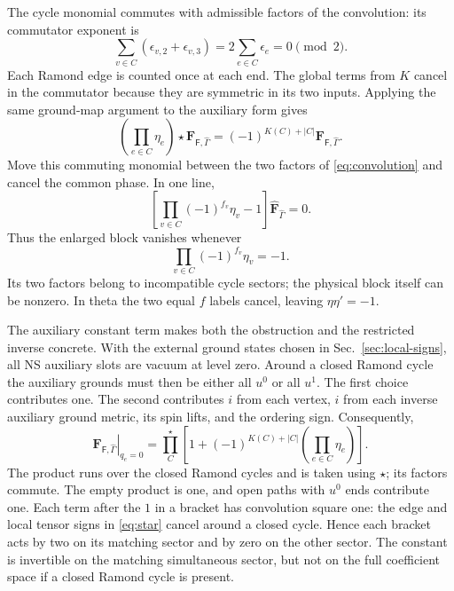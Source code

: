 \documentclass[11pt]{article}
\newcommand{\F}{\mathsf F}
\numberwithin{equation}{section}
\begin{document}
The cycle monomial commutes with admissible factors of the convolution:
its commutator exponent is
\begin{equation}
 \sum_{v\in C}(\epsilon_{v,2}+\epsilon_{v,3})
                  =2\sum_{e\in C}\epsilon_e=0\pmod2.
 \label{eq:loop-centrality}
\end{equation}
Each Ramond edge is counted once at each end. The global terms from
$K$ cancel in the commutator because they are symmetric in its two inputs.
Applying the same ground-map argument to the auxiliary
form gives
\begin{equation}
 \left(\prod_{e\in C}\eta_e\right)\star\mathbf F_{\F,\hat\Gamma}
 =(-1)^{K(C)+|C|}\mathbf F_{\F,\hat\Gamma}.
 \label{eq:aux-sector}
\end{equation}
Move this commuting monomial between the two factors of
\eqref{eq:convolution} and cancel the common phase. In one line,
\begin{equation}
 \left[\prod_{v\in C}(-1)^{f_v}\eta_v-1\right]
                               \widehat{\mathbf F}_{\hat\Gamma}=0.
 \label{eq:loop-cancellation}
\end{equation}
Thus the enlarged block vanishes whenever
\begin{equation}
 \prod_{v\in C}(-1)^{f_v}\eta_v=-1.
 \label{eq:odd-cycle}
\end{equation}
Its two factors belong to incompatible cycle sectors; the physical block
itself can be nonzero. In theta the two equal $f$ labels cancel, leaving
$\eta\eta'=-1$.

The auxiliary constant term makes both the obstruction and the restricted
inverse concrete. With the external ground states chosen in
Sec.~\ref{sec:local-signs}, all NS auxiliary slots are vacuum at level zero. Around a closed
Ramond cycle the auxiliary grounds must then be either all $u^0$ or all
$u^1$. The first choice contributes one. The second contributes $i$ from
each vertex, $i$ from each inverse auxiliary ground metric, its spin lifts, and the
ordering sign. Consequently,
\begin{equation}
 \left.\mathbf F_{\F,\hat\Gamma}\right|_{q_e=0}
 =\prod_{C}^{\star}
 \left[1+(-1)^{K(C)+|C|}
              \left(\prod_{e\in C}\eta_e\right)\right].
 \label{eq:constant-projectors}
\end{equation}
The product runs over the closed Ramond cycles and is taken using $\star$;
its factors commute. The empty product is one, and open paths with
$u^0$ ends contribute one. Each term after the $1$ in a bracket has
convolution square one: the edge and local tensor signs in
\eqref{eq:star} cancel around a closed cycle. Hence each bracket acts
by two on its matching sector and
by zero on the other sector. The constant is invertible on the matching
simultaneous sector, but not on the full coefficient space if a closed
Ramond cycle is present.
\end{document}
